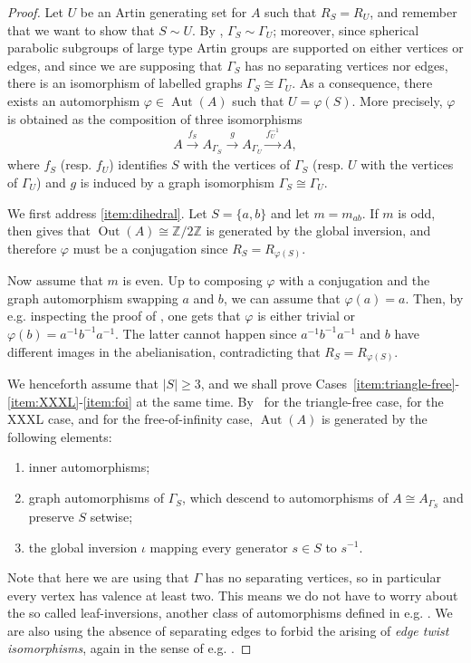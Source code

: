 \documentclass[svgnames]{amsart}
\theoremstyle{plain}
\theoremstyle{definition}
\newcommand{\aut}[1]{\operatorname{Aut}(#1)}
\newcommand{\out}[1]{\operatorname{Out}(#1)}
\newcommand{\Z}{\mathbb{Z}}
\renewcommand{\phi}{\varphi}
\begin{document}
\begin{proof} 
Let $U$ be an Artin generating set for $A$ such that $R_S=R_U$, and remember that we want to show that $S\sim U$. By \cite[Corollary B]{MV_characterising_LT}, $\Gamma_S\sim\Gamma_U$; moreover, since spherical parabolic subgroups of large type Artin groups are supported on either vertices or edges, and since we are supposing that $\Gamma_S$ has no separating vertices nor edges, there is an isomorphism of labelled graphs $\Gamma_S\cong \Gamma_U$. As a consequence, there exists an automorphism $\phi\in \aut{A}$ such that $U=\phi(S)$. More precisely, $\phi$ is obtained as the composition of three isomorphisms
$$A\xrightarrow[]{f_S} A_{\Gamma_{S}}\xrightarrow[]{g}A_{\Gamma_{U}}\xrightarrow[]{f_{U}^{-1}}A,$$
where $f_S$ (resp. $f_{U}$) identifies $S$ with the vertices of $\Gamma_S$ (resp. $U$ with the vertices of $\Gamma_{U}$) and $g$ is induced by a graph isomorphism $\Gamma_S\cong \Gamma_{U}$.

\medskip 
We first address \eqref{item:dihedral}. Let $S=\{a,b\}$ and let $m=m_{ab}$. If $m$ is odd, then \cite[Theorem C]{Autdihedral} gives that $\out{A}\cong \Z/2\Z$ is generated by the global inversion, and therefore $\phi$ must be a conjugation since $R_S=R_{\phi(S)}$. 
    
Now assume that $m$ is even. Up to composing $\phi$ with a conjugation and the graph automorphism swapping $a$ and $b$, we can assume that $\phi(a)=a$. Then, by e.g. inspecting the proof of \cite[Lemma 2.9]{Jones_VF}, one gets that $\phi$ is either trivial or $\phi(b)=a^{-1}b^{-1}a^{-1}$. The latter cannot happen since $a^{-1}b^{-1}a^{-1}$ and $b$ have different images in the abelianisation, contradicting that $R_S = R_{\phi(S)}$.


\medskip We henceforth assume that $|S|\ge 3$, and we shall prove Cases~\eqref{item:triangle-free}-\eqref{item:XXXL}-\eqref{item:foi} at the same time. By~\cite[Theorem 1 and Theorem 2]{crisp2005automorphisms} for the triangle-free case, \cite[Theorem 9.6]{BMV} for the XXXL case, and \cite[Theorem A]{Vaskou_LTFOI} for the free-of-infinity case, $\aut{A}$ is generated by the following elements:
    \begin{enumerate}[label=(\roman*{})]
        \item\label{item_type1} inner automorphisms;
        \item\label{item_type2} graph automorphisms of $\Gamma_S$, which descend to automorphisms of $A\cong A_{\Gamma_S}$ and preserve $S$ setwise;
        \item the global inversion $\iota$ mapping every generator $s\in S$ to $s^{-1}$. 
    \end{enumerate}
    Note that here we are using that $\Gamma$ has no separating vertices, so in particular every vertex has valence at least two. This means we do not have to worry about the so called leaf-inversions, another class of automorphisms defined in e.g. \cite[page 1383]{crisp2005automorphisms}. We are also using the absence of separating edges to forbid the arising of \emph{edge twist isomorphisms}, again in the sense of e.g. \cite[1383]{crisp2005automorphisms}. 


\end{proof}
\end{document}
